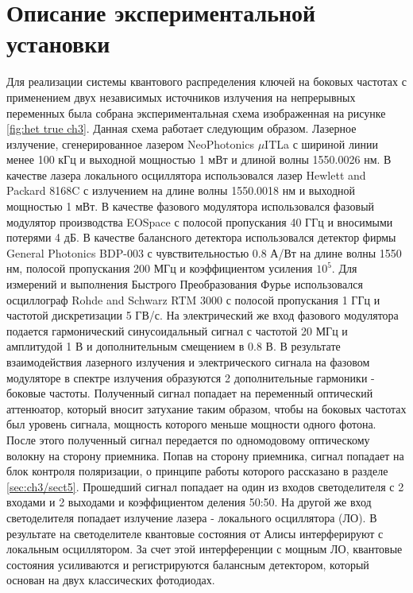 \section{Описание экспериментальной установки}\label{sec:ch3/sect6}
Для реализации системы квантового распределения ключей на боковых частотах с применением двух независимых источников излучения на непрерывных переменных была собрана экспериментальная схема изображенная на рисунке \ref*{fig:het true ch3}.
Данная схема работает следующим образом. Лазерное излучение, сгенерированное лазером NeoPhotonics $\mu$ITLa с шириной линии менее 100 кГц и выходной мощностью 1 мВт и длиной волны 1550.0026 нм. В качестве лазера локального осциллятора использовался лазер Hewlett and Packard 8168C с излучением на длине волны 1550.0018 нм и выходной мощностью 1 мВт. В качестве фазового модулятора использовался фазовый модулятор производства EOSpace с полосой пропускания 40 ГГц и вносимыми потерями 4 дБ.
В качестве балансного детектора использовался детектор фирмы General Photonics BDP-003 с чувствительностью 0.8 А/Вт на длине волны 1550 нм, полосой пропускания 200 МГц и коэффициентом усиления ${10^5}$.
Для измерений и выполнения Быстрого Преобразования Фурье использовался осциллограф Rohde and Schwarz RTM 3000 с полосой пропускания 1 ГГц и частотой дискретизации 5 ГВ/с.
На электрический же вход фазового модулятора подается гармонический синусоидальный сигнал с частотой 20 МГц и амплитудой 1 В и дополнительным смещением в 0.8 В. В результате взаимодействия лазерного излучения и электрического сигнала на фазовом модуляторе в спектре излучения образуются 2 дополнительные гармоники - боковые частоты.
Полученный сигнал попадает на переменный оптический аттенюатор, который вносит затухание таким образом, чтобы на боковых частотах был уровень сигнала, мощность которого меньше мощности одного фотона.
После этого полученный сигнал передается по одномодовому оптическому волокну на сторону приемника. Попав на сторону приемника, сигнал попадает на блок контроля поляризации, о принципе работы которого рассказано в разделе \ref{sec:ch3/sect5}. Прошедший сигнал попадает на один из входов светоделителя с 2 входами и 2 выходами и коэффициентом деления 50:50.
На другой же вход светоделителя попадает излучение лазера - локального осциллятора (ЛО). В результате на светоделителе квантовые состояния от Алисы интерферируют с локальным осциллятором. За счет этой интерференции с мощным ЛО, квантовые состояния усиливаются и регистрируются балансным детектором, который основан на двух классических фотодиодах.


